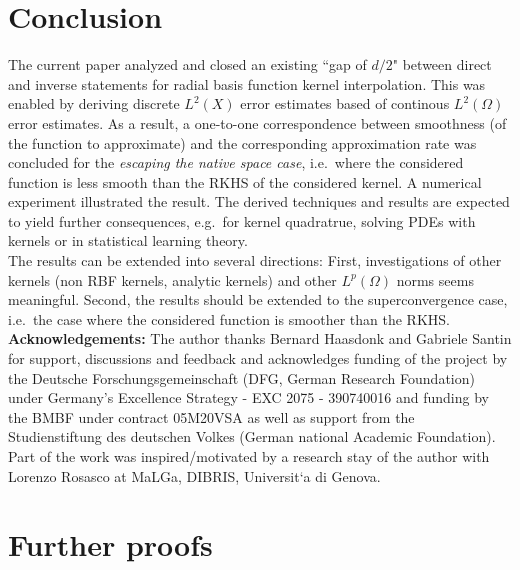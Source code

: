 \documentclass[a4paper, 10pt]{article}
\begin{document}
\section{Conclusion} \label{sec:conclusion}

The current paper analyzed and closed an existing ``gap of $d/2$" between direct and inverse statements for radial basis function kernel interpolation.
This was enabled by deriving discrete $L^2(X)$ error estimates based of continous $L^2(\Omega)$ error estimates.
As a result, a one-to-one correspondence between smoothness (of the function to approximate) and the corresponding approximation rate was concluded for the \textit{escaping the native space case}, i.e.\ where the considered function is less smooth than the RKHS of the considered kernel.
A numerical experiment illustrated the result.
The derived techniques and results are expected to yield further consequences, e.g.\ for kernel quadratrue, solving PDEs with kernels or in statistical learning theory. \\
The results can be extended into several directions:
First, investigations of other kernels (non RBF kernels, analytic kernels) and other $L^p(\Omega)$ norms seems meaningful.
Second, the results should be extended to the superconvergence case, i.e.\ the case where the considered function is smoother than the RKHS. \\


\textbf{Acknowledgements:}
The author thanks Bernard Haasdonk and Gabriele Santin for support, discussions and feedback
and acknowledges funding of the project by the Deutsche Forschungsgemeinschaft (DFG, German Research Foundation) under Germany's Excellence Strategy - EXC 2075 - 390740016 and funding by the BMBF under contract 05M20VSA as well as support from the Studienstiftung des deutschen Volkes (German national Academic Foundation).
Part of the work was inspired/motivated by a research stay of the author with Lorenzo Rosasco at MaLGa, DIBRIS, Universit`a di Genova.
 
 
 

 
 
 
\appendix 

\section{Further proofs} \label{sec:proofs}
\end{document}
